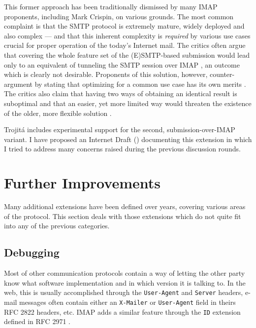 \documentclass[trojita]{subfiles}
\begin{document}
This former approach has been traditionally dismissed by many IMAP proponents, including Mark Crispin, on various
grounds.  The most common complaint is that the SMTP protocol is extremely mature, widely deployed and also complex ---
and that this inherent complexity is {\em required} by various use cases crucial for proper operation of the today's
Internet mail.  The critics often argue that covering the whole feature set of the (E)SMTP-based submission would lead
only to an equivalent of tunneling the SMTP session over IMAP \cite{crispin-smtp-tunneling}
\cite{cridland-imap-submission-sendmail-not-enough}, an outcome which is clearly not desirable.  Proponents of this
solution, however, counter-argument by stating that optimizing for a common use case has its own merits
\cite{brong-common-sendmail-makes-sense}.  The critics also claim that having two ways of obtaining an identical result
is suboptimal and that an easier, yet more limited way would threaten the existence of the older, more flexible solution
\cite{crispin-submission-would-kill-smtp}.

Trojitá includes experimental support for the second, submission-over-IMAP variant.  I have proposed an Internet Draft
() documenting this extension in which I tried to address many concerns raised during the
previous discussion rounds.

\section{Further Improvements}

Many additional extensions have been defined over years, covering various areas of the protocol.  This section deals
with those extensions which do not quite fit into any of the previous categories.

\subsection{Debugging}

Most of other communication protocols contain a way of letting the other party know what software implementation and in
which version it is talking to.  In the web, this is usually accomplished through the {\tt User-Agent} and {\tt Server}
headers, e-mail messages often contain either an {\tt X-Mailer} or {\tt User-Agent} field in theirs RFC 2822 headers,
etc.  IMAP adds a similar feature through the {\tt ID} extension defined in RFC 2971 \cite{rfc2971}.
\end{document}
